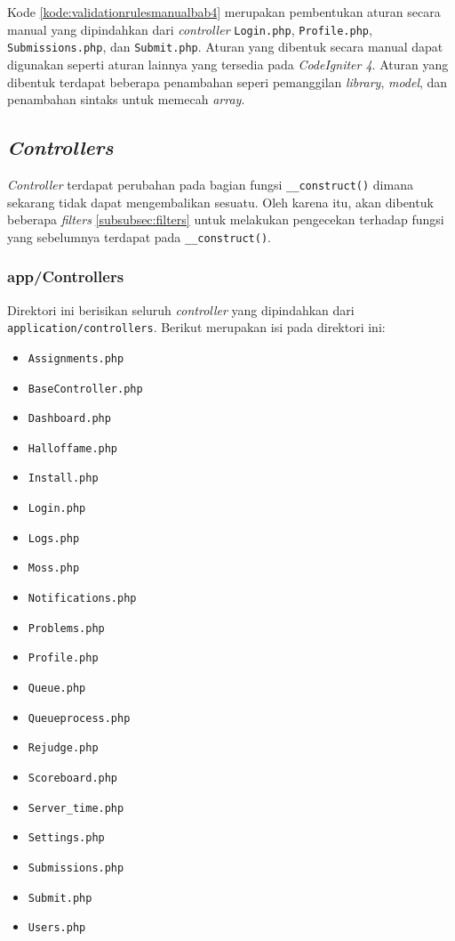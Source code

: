 Kode \ref{kode:validationrulesmanualbab4} merupakan pembentukan aturan secara manual yang dipindahkan dari \textit{controller} \texttt{Login.php}, \texttt{Profile.php}, \texttt{Submissions.php}, dan \texttt{Submit.php}. Aturan yang dibentuk secara manual dapat digunakan seperti aturan lainnya yang tersedia pada \textit{CodeIgniter 4}. Aturan yang dibentuk terdapat beberapa penambahan seperi pemanggilan \textit{library}, \textit{model}, dan penambahan sintaks untuk memecah \textit{array}.

\subsection{\textit{Controllers}}
\textit{Controller} terdapat perubahan pada bagian fungsi \texttt{\_\_construct()} dimana sekarang tidak dapat mengembalikan sesuatu. Oleh karena itu, akan dibentuk beberapa \textit{filters} \ref{subsubsec:filters} untuk melakukan pengecekan terhadap fungsi yang sebelumnya terdapat pada \texttt{\_\_construct()}.
	\subsubsection{app/Controllers} 
	Direktori ini berisikan seluruh \textit{controller} yang dipindahkan dari \texttt{application/controllers}. Berikut merupakan isi pada direktori ini:
	\begin{itemize}
		\item \texttt{Assignments.php}
		\item \texttt{BaseController.php}
		\item \texttt{Dashboard.php}
		\item \texttt{Halloffame.php}
		\item \texttt{Install.php}
		\item \texttt{Login.php}
		\item \texttt{Logs.php}
		\item \texttt{Moss.php}
		\item \texttt{Notifications.php}
		\item \texttt{Problems.php}
		\item \texttt{Profile.php}
		\item \texttt{Queue.php}
		\item \texttt{Queueprocess.php}
		\item \texttt{Rejudge.php}
		\item \texttt{Scoreboard.php}
		\item \texttt{Server\_time.php}
		\item \texttt{Settings.php}
		\item \texttt{Submissions.php}
		\item \texttt{Submit.php}
		\item \texttt{Users.php}
	\end{itemize}

